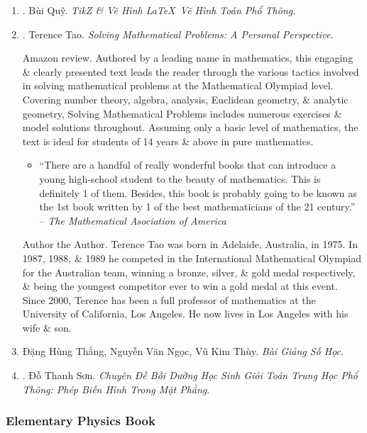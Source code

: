 \documentclass{article}
\begin{document}
\begin{enumerate}
	\item \cite{Quy2022}. Bùi Quỹ. {\it TikZ \& Vẽ Hình \LaTeX\ Vẽ Hình Toán Phổ Thông}.\hfill{\sf[reading]}
	
	\item \cite{Tao2006}. {\sc Terence Tao}. {\it Solving Mathematical Problems: A Personal Perspective}. {}
	
	{\sf Amazon review.} Authored by a leading name in mathematics, this engaging \& clearly presented text leads the reader through the various tactics involved in solving mathematical problems at the Mathematical Olympiad level. Covering number theory, algebra, analysis, Euclidean geometry, \& analytic geometry, Solving Mathematical Problems includes numerous exercises \& model solutions throughout. Assuming only a basic level of mathematics, the text is ideal for students of 14 years \& above in pure mathematics.
	\begin{itemize}
		\item ``There are a handful of really wonderful books that can introduce a young high-school student to the beauty of mathematics. This is definitely 1 of them. Besides, this book is probably going to be known as the 1st book written by 1 of the best mathematicians of the 21 century.'' -- {\it The Mathematical Asociation of America}
	\end{itemize}
	{\sf Author the Author.} {\sc Terence Tao} was born in Adelaide, Australia, in 1975. In 1987, 1988, \& 1989 he competed in the International Mathematical Olympiad for the Australian team, winning a bronze, silver, \& gold medal respectively, \& being the youngest competitor ever to win a gold medal at this event. Since 2000, Terence has been a full professor of mathematics at the University of California, Los Angeles. He now lives in Los Angeles with his wife \& son.
	
	\item {\sc Đặng Hùng Thắng, Nguyễn Văn Ngọc, Vũ Kim Thùy}. {\it Bài Giảng Số Học}.
	
	\item \cite{Son2006}. {\sc Đỗ Thanh Sơn}. {\it Chuyên Đề Bồi Dưỡng Học Sinh Giỏi Toán Trung Học Phổ Thông: Phép Biến Hình Trong Mặt Phẳng}.\hfill{\sf[reading]}	
\end{enumerate}

\subsubsection{Elementary Physics Book}
\end{document}
